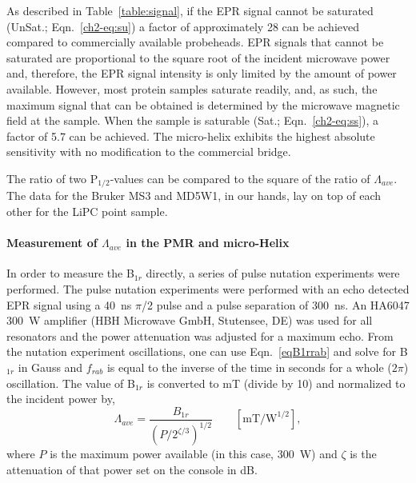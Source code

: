 As described in Table~\ref{table:signal}, if the EPR signal cannot be saturated (UnSat.; Eqn.~\ref{ch2-eq:su}) a factor of approximately 28 can be achieved compared to commercially available probeheads. EPR signals that cannot be saturated are proportional to the square root of the incident microwave power and, therefore, the EPR signal intensity is only limited by the amount of power available. However, most protein samples saturate readily, and, as such, the maximum signal that can be obtained is determined by the microwave magnetic field at the sample. When the sample is saturable (Sat.; Eqn.~\ref{ch2-eq:ss}), a factor of 5.7 can be achieved. The micro-helix exhibits the highest absolute sensitivity with no modification to the commercial bridge. 

The ratio of two P$_{1/2}$-values can be compared to the square of the ratio of $\Lambda_{ave}$. The data for the Bruker MS3 and MD5W1, in our hands, lay on top of each other for the LiPC point sample.

\paragraph{Measurement of $\Lambda_{ave}$ in the PMR and micro-Helix}
In order to measure the B$_{1r}$ directly, a series of pulse nutation experiments were performed. \cite{schweiger2001principles} The pulse nutation experiments were performed with an echo detected EPR signal using a 40~ns $\pi$/2 pulse and a pulse separation of 300~ns. An HA6047 300~W amplifier (HBH Microwave GmbH, Stutensee, DE) was used for all resonators and the power attenuation was adjusted for a maximum echo. From the nutation experiment oscillations, one can use Eqn.~\ref{eqB1rrab} and solve for B$_{1r}$ in Gauss and $f_{rab}$ is equal to the inverse of the time in seconds for a whole ($2\pi$) oscillation. The value of B$_{1r}$ is converted to mT (divide by 10) and normalized to the incident power by,
\begin{equation}
\Lambda_{ave} = \frac{B_{1r}}{(P/2^{\zeta/3})^{1/2}}\qquad [\text{mT/W}^{1/2}],
\end{equation}
where $P$ is the maximum power available (in this case, 300~W) and $\zeta$ is the attenuation of that power set on the console in dB. 

